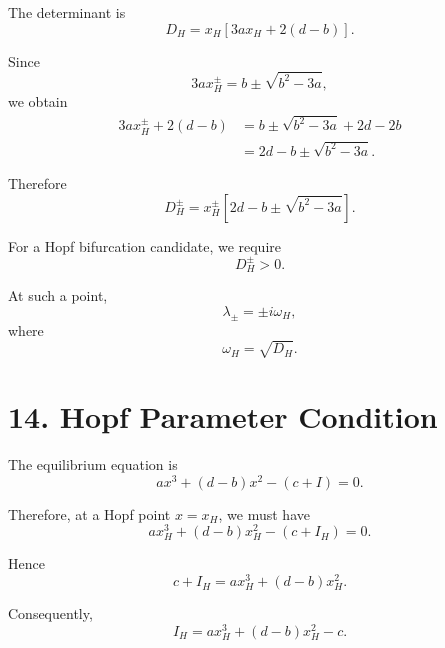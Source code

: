 \documentclass[11pt,a4paper]{article}
\begin{document}
The determinant is
\begin{equation}
D_H
=
x_H
\left[
3ax_H+2(d-b)
\right].
\tag{46}
\end{equation}

Since
\begin{equation}
3ax_H^\pm
=
b\pm\sqrt{b^2-3a},
\end{equation}
we obtain
\begin{align}
3ax_H^\pm+2(d-b)
&=
b\pm\sqrt{b^2-3a}+2d-2b\\
&=
2d-b\pm\sqrt{b^2-3a}.
\end{align}

Therefore
\begin{equation}
\boxed{
D_H^\pm
=
x_H^\pm
\left[
2d-b\pm\sqrt{b^2-3a}
\right].
}
\tag{47}
\end{equation}

For a Hopf bifurcation candidate, we require
\begin{equation}
\boxed{
D_H^\pm>0.
}
\tag{48}
\end{equation}

At such a point,
\begin{equation}
\lambda_{\pm}
=
\pm i\omega_H,
\end{equation}
where
\begin{equation}
\boxed{
\omega_H=\sqrt{D_H}.
}
\tag{49}
\end{equation}

\section{14. Hopf Parameter Condition}

The equilibrium equation is
\begin{equation}
a x^3+(d-b)x^2-(c+I)=0.
\end{equation}

Therefore, at a Hopf point $x=x_H$, we must have
\begin{equation}
a x_H^3+(d-b)x_H^2-(c+I_H)=0.
\end{equation}

Hence
\begin{equation}
\boxed{
c+I_H
=
a x_H^3+(d-b)x_H^2.
}
\tag{50}
\end{equation}

Consequently,
\begin{equation}
\boxed{
I_H
=
a x_H^3+(d-b)x_H^2-c.
}
\tag{51}
\end{equation}
 
\end{document}
